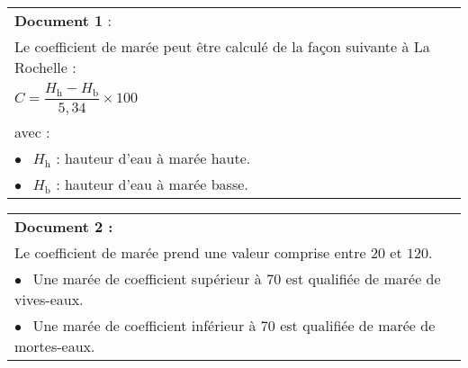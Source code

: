 \parbox{0.48\linewidth}{
\begin{tabularx}{\linewidth}{|X|}\hline
\textbf{Document 1} :\\
Le coefficient de marée peut être calculé de la façon suivante à La Rochelle :\\
$C = \dfrac{H_{\text{h}} - H_{\text{b}}}{5,34} \times 100$\\
avec :\\
\hspace{1cm}$\bullet~~$ $H_{\text{h}}$ : hauteur d'eau à marée haute.\\
\hspace{1cm}$\bullet~~$ $H_{\text{b}}$  : hauteur d'eau à marée basse.\\ \hline
\end{tabularx}
}\hfill
\parbox{0.48\linewidth}{
\begin{tabularx}{\linewidth}{|X|}\hline
\textbf{Document 2 :}\\
Le coefficient de marée prend une valeur comprise entre $20$ et $120$.\\
\hspace{1cm}$\bullet~~$ Une marée de coefficient supérieur à 70 est qualifiée de marée de
vives-eaux.\\
\hspace{1cm}$\bullet~~$ Une marée de coefficient inférieur à
70 est qualifiée de marée de mortes-eaux.\\ \hline
\end{tabularx}
}
